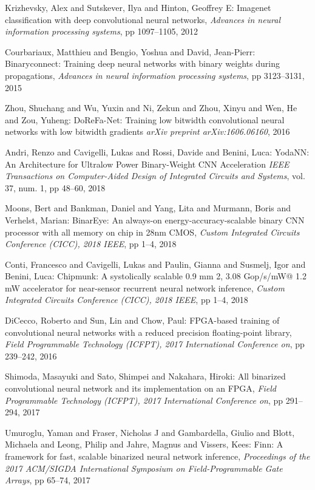 \documentclass[techrep,english]{ipsj} %
\begin{document}
{\begin{thebibliography}{99}
  Krizhevsky, Alex and Sutskever, Ilya and Hinton, Geoffrey E:
  Imagenet classification with deep convolutional neural networks,
  {\it Advances in neural information processing systems},
  pp 1097–1105, 2012

  Courbariaux, Matthieu and Bengio, Yoshua and David, Jean-Pierr:
  Binaryconnect: Training deep neural networks with binary weights during propagations,
  {\it Advances in neural information processing systems},
  pp 3123–3131, 2015

  Zhou, Shuchang and Wu, Yuxin and Ni, Zekun and Zhou, Xinyu and Wen, He and Zou, Yuheng:
  DoReFa-Net: Training low bitwidth convolutional neural networks with low bitwidth gradients
  {\it  arXiv preprint arXiv:1606.06160},
  2016

  Andri, Renzo and Cavigelli, Lukas and Rossi, Davide and Benini, Luca:
  YodaNN: An Architecture for Ultralow Power Binary-Weight CNN Acceleration
  {\it IEEE Transactions on Computer-Aided Design of Integrated Circuits and Systems},
  vol. 37, num. 1, pp 48–60, 2018

  Moons, Bert and Bankman, Daniel and Yang, Lita and Murmann, Boris and Verhelst, Marian:
  BinarEye: An always-on energy-accuracy-scalable binary CNN processor with all memory on chip in 28nm CMOS,
  {\it Custom Integrated Circuits Conference (CICC), 2018 IEEE},
  pp 1–4, 2018


  Conti, Francesco and Cavigelli, Lukas and Paulin, Gianna and Susmelj, Igor and Benini, Luca:
  Chipmunk: A systolically scalable 0.9 mm 2, 3.08 Gop/s/mW@ 1.2 mW accelerator for near-sensor recurrent neural network inference,
  {\it Custom Integrated Circuits Conference (CICC), 2018 IEEE},
  pp 1–4, 2018

  DiCecco, Roberto and Sun, Lin and Chow, Paul:
  FPGA-based training of convolutional neural networks with a reduced precision floating-point library,
  {\it  Field Programmable Technology (ICFPT), 2017 International Conference on},
  pp 239–242, 2016

  Shimoda, Masayuki and Sato, Shimpei and Nakahara, Hiroki:
  All binarized convolutional neural network and its implementation on an FPGA,
  {\it  Field Programmable Technology (ICFPT), 2017 International Conference on},
  pp 291–294, 2017

  Umuroglu, Yaman and Fraser, Nicholas J and Gambardella, Giulio and Blott, Michaela and Leong, Philip and Jahre, Magnus and Vissers, Kees:
  Finn: A framework for fast, scalable binarized neural network inference,
  {\it  Proceedings of the 2017 ACM/SIGDA International Symposium on Field-Programmable Gate Arrays},
  pp 65–74, 2017



\end{thebibliography}}
\end{document}
